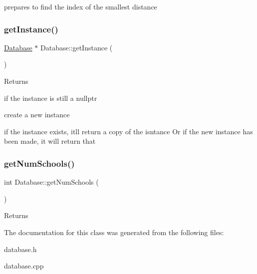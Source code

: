 prepares to find the index of the smallest distance \mbox{\label{class_database_a5a3b028f980a577ea0b809eb92312761}} 
\subsubsection{\texorpdfstring{get\+Instance()}{getInstance()}}
{\footnotesize\ttfamily \hyperlink{class_database}{Database} $\ast$ Database\+::get\+Instance (\begin{DoxyParamCaption}{ }\end{DoxyParamCaption})\hspace{0.3cm}{\ttfamily [static]}}


\begin{DoxyItemize}
\item \begin{DoxyReturn}{Returns}

\end{DoxyReturn}

\end{DoxyItemize}if the instance is still a nullptr

create a new instance

if the instance exists, it\textquotesingle{}ll return a copy of the isntance Or if the new instance has been made, it will return that \mbox{\label{class_database_aa5d167b5300b715844a760ed9d7e223f}} 
\subsubsection{\texorpdfstring{get\+Num\+Schools()}{getNumSchools()}}
{\footnotesize\ttfamily int Database\+::get\+Num\+Schools (\begin{DoxyParamCaption}{ }\end{DoxyParamCaption})}


\begin{DoxyItemize}
\item \begin{DoxyReturn}{Returns}



\end{DoxyReturn}

\end{DoxyItemize}

The documentation for this class was generated from the following files\+:\begin{DoxyCompactItemize}
\item 
database.\+h\item 
database.\+cpp\end{DoxyCompactItemize}
